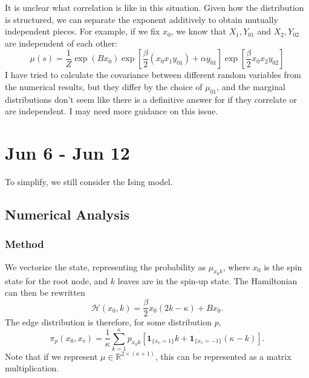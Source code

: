 \documentclass[12pt]{article}
\numberwithin{equation}{section}
\begin{document}
It is unclear what correlation is like in this situation. Given how the distribution is structured, we can separate the exponent additively to obtain
mutually independent pieces. For example, if we fix $x_0$, we know that $X_1, Y_{01}$ and $X_2, Y_{02}$ are independent of each other:
\begin{equation*}
    \mu(s) = \frac1Z \exp(Bx_0) \exp\left[\frac{\beta}{2}(x_0x_1y_{01}) + \alpha y_{01}\right] \exp\left[ \frac\beta2 x_0x_2y_{02}\right]
\end{equation*}
I have tried to calculate the covariance between different random variables from the numerical results, but they differ by the choice of $\mu_{01}$,
and the marginal distributions don't seem like there is a definitive answer for if they correlate or are independent. I may need more guidance on this
issue.

\newpage

\section{Jun 6 - Jun 12}

To simplify, we still consider the Ising model.

\subsection{Numerical Analysis}

\subsubsection{Method}

We vectorize the state, representing the probability as $\mu_{x_0k}$, where $x_0$ is the spin state for the root node, and $k$ leaves
are in the spin-up state. The Hamiltonian can then be rewritten
\begin{equation*}
    \mathcal{H}(x_0, k) = \frac{\beta}{2}x_0(2k-\kappa) + Bx_0.
\end{equation*}
The edge distribution is therefore, for some distribution $p$,
\begin{equation*}
    \pi_p(x_0, x_v)=\frac1\kappa\sum_{k=1}^\kappa p_{x_0k}\left[\mathbf{1}_{\{x_v=1\}}k + \mathbf{1}_{\{x_v=-1\}}(\kappa-k)\right].
\end{equation*}
Note that if we represent $\mu\in\mathbb{R}^{2\times {(\kappa+1)}}$, this can be represented as a matrix multiplication.
\end{document}
